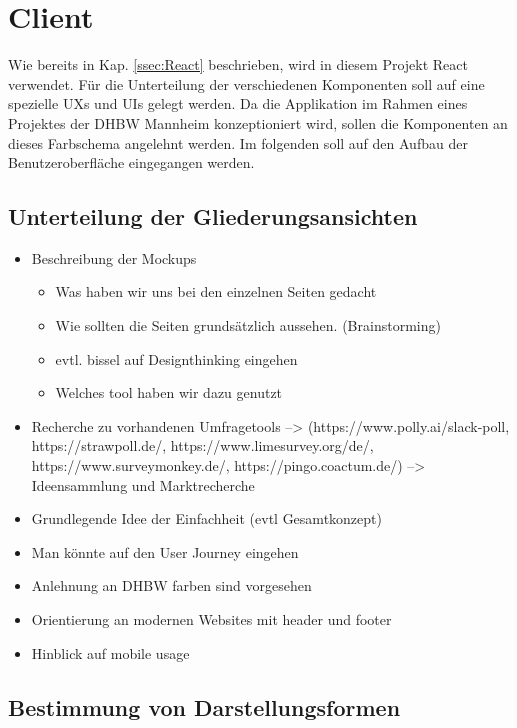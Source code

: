 \section{Client}
\authorsection{\authorSG}

Wie bereits in Kap. \vref{ssec:React} beschrieben, wird in diesem Projekt React verwendet. 
Für die Unterteilung der verschiedenen Komponenten soll auf eine spezielle \acfp{UX} und \acfp{UI} gelegt werden. 
Da die Applikation im Rahmen eines Projektes der DHBW Mannheim konzeptioniert wird, sollen die Komponenten an dieses Farbschema angelehnt werden. 
Im folgenden soll auf den Aufbau der Benutzeroberfläche eingegangen werden. 














\subsection{Unterteilung der Gliederungsansichten}

\begin{itemize}
	\item Beschreibung der Mockups 
	 \begin{itemize}
		 \item Was haben wir uns bei den einzelnen Seiten gedacht
		 \item Wie sollten die Seiten grundsätzlich aussehen. (Brainstorming)
		 \item evtl. bissel auf Designthinking eingehen
		 \item Welches tool haben wir dazu genutzt
	 \end{itemize}
	 \item Recherche zu vorhandenen Umfragetools --> (https://www.polly.ai/slack-poll, https://strawpoll.de/, https://www.limesurvey.org/de/, https://www.surveymonkey.de/, https://pingo.coactum.de/)
	 --> Ideensammlung und Marktrecherche
	 \item Grundlegende Idee der Einfachheit (evtl Gesamtkonzept)
	 \item Man könnte auf den User Journey eingehen
	 \item Anlehnung an DHBW farben sind vorgesehen
	 \item Orientierung an modernen Websites mit header und footer
	 \item Hinblick auf mobile usage
\end{itemize}
\subsection{Bestimmung von Darstellungsformen}